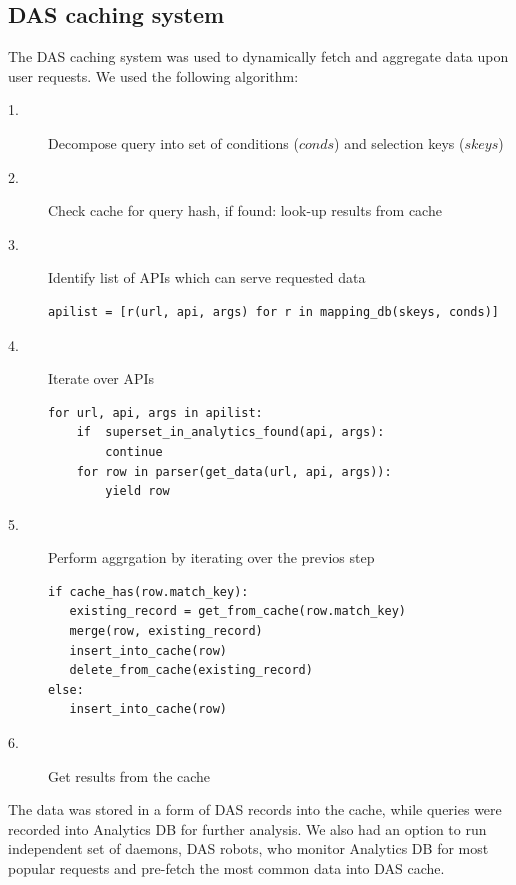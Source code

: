 \documentclass[a4paper]{jpconf}
\begin{document}
\subsection{DAS caching system}
The DAS caching system was used to dynamically fetch
and aggregate data upon user requests. We used the following 
algorithm:
\begin{description}
\item[  1.] Decompose query into set of conditions ($conds$) 
and selection keys ($skeys$)
\item[  2.] Check cache for query hash, if found: look-up results from cache
\item[  3.] Identify list of APIs which can serve requested data
\begin{verbatim}
apilist = [r(url, api, args) for r in mapping_db(skeys, conds)]
\end{verbatim}
\item[  4.] Iterate over APIs
\begin{verbatim}
for url, api, args in apilist:
    if  superset_in_analytics_found(api, args):
        continue
    for row in parser(get_data(url, api, args)):
        yield row
\end{verbatim}
\item[  5.] Perform aggrgation by iterating over the previos step
\begin{verbatim}
if cache_has(row.match_key):
   existing_record = get_from_cache(row.match_key)
   merge(row, existing_record)
   insert_into_cache(row)
   delete_from_cache(existing_record)
else:
   insert_into_cache(row)
\end{verbatim}
\item[  6.] Get results from the cache
\end{description}
The data was stored in a form of DAS records into the cache, while
queries were recorded into Analytics DB for further analysis. We
also had an option to run independent set of daemons, DAS robots, who
monitor Analytics DB for most popular requests and pre-fetch the most
common data into DAS cache. 

\end{document}
